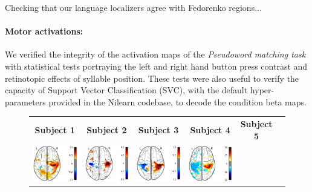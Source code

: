 Checking that our language localizers agree with Fedorenko regions...






\paragraph{Motor activations:}
We verified the integrity of the activation maps of the \emph{Pseudoword matching task} with statistical tests portraying the left and right hand button press contrast and retinotopic effects of syllable position.
These tests were also useful to verify the capacity of Support Vector Classification (SVC), with the default hyper-parameters provided in the Nilearn\citep{abraham2014machine} codebase, to decode the condition beta maps.

\begin{figure}[hb]
\scriptsize
\hspace{-4ex}
\begin{tabular}{cccccl}
\textbf{\Large Subject 1} & \textbf{\Large Subject 2} & \textbf{\Large Subject 3} & \textbf{\Large Subject 4} & \textbf{\Large Subject 5} & {}\\
{\includegraphics[width=.14\linewidth]{figures/part_II/press_vis_01.pdf}}
\hspace{1ex}
&{\includegraphics[width=.14\linewidth]{figures/part_II/press_vis_03.pdf}}
\hspace{1ex}
&{\includegraphics[width=.14\linewidth]{figures/part_II/press_vis_04.pdf}}
\hspace{1ex}
&{\includegraphics[width=.14\linewidth]{figures/part_II/press_vis_05.pdf}}
\hspace{1ex}

\end{tabular}
\end{figure}
